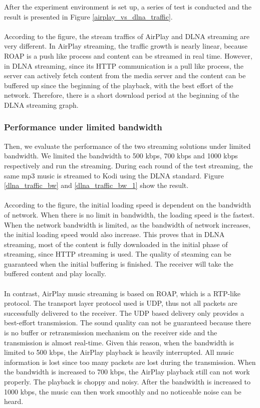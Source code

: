 \clearpage
After the experiment environment is set up, a series of test is conducted and
the result is presented in Figure \ref{airplay_vs_dlna_traffic}.\\
\\
According to the figure, the stream traffics of
AirPlay and DLNA streaming are very different. In AirPlay streaming, the traffic
growth is nearly linear, because ROAP is a push like process and content can be
streamed in real time. However, in DLNA streaming, since its HTTP communication is a pull
like process, the server can actively fetch content from the media server and the content can
be buffered  up since the beginning of the playback, with the best effort of the network.
Therefore, there is a short download period at the beginning of the DLNA
 streaming graph.
\subsubsection{Performance under limited bandwidth }
Then, we evaluate the performance of  the two streaming solutions under limited bandwidth. We limited the bandwidth to 500 kbps, 700 kbps and 1000 kbps respectively and run the streaming. 
During each round of the test streaming, the same mp3 music is streamed to Kodi
using the DLNA standard. Figure \ref{dlna_traffic_bw} and
\ref{dlna_traffic_bw_1} show the result.\\
\\
According to the figure, the initial loading speed is dependent on the bandwidth of network. When there is no limit in bandwidth, the loading speed is the fastest. When the network bandwidth is limited, as the bandwidth of network increases, the initial loading speed would also increase. This proves that in DLNA streaming, most of the content is fully downloaded in the initial phase of streaming,  since HTTP streaming is used. The quality of steaming can be guaranteed when the initial buffering is finished. The receiver will take the buffered content and play locally.\\
\\
In contrast, AirPlay music streaming is based on ROAP, which is a RTP-like protocol. The transport layer protocol used is UDP, thus not all packets are successfully delivered to the receiver. The UDP based delivery only provides a best-effort transmission. The sound quality can not be guaranteed because there is no buffer or retransmission mechanism on the receiver side and the transmission is almost real-time. Given this reason, when the bandwidth is limited to 500 kbps, the AirPlay playback is heavily interrupted. All music information is lost since too many packets are lost during the transmission. When the bandwidth is increased to 700 kbps, the AirPlay playback still can not work properly. The playback is choppy and noisy. After the bandwidth is increased to 1000 kbps, the music can then work smoothly and no noticeable noise can be heard.\\
